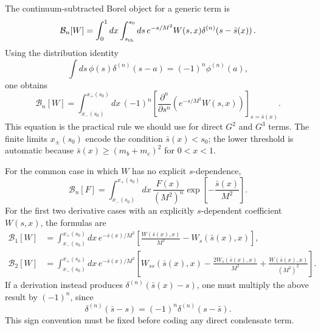 \documentclass[11pt]{article}
\begin{document}
The continuum-subtracted Borel object for a generic term is
\begin{equation}
  \mathcal B_n[W]
  =
  \int_0^1dx
  \int_{s_{\rm th}}^{s_0}ds\,
  e^{-s/M^2}
  W(s,x)
  \delta^{(n)}\!\left(s-\bar s(x)\right).
\end{equation}
Using the distribution identity
\begin{equation}
  \int ds\,\phi(s)\delta^{(n)}(s-a)
  =
  (-1)^n\phi^{(n)}(a),
\end{equation}
one obtains
\begin{equation}
  \mathcal B_n[W]
  =
  \int_{x_-(s_0)}^{x_+(s_0)}dx\,
  (-1)^n
  \left[
    \frac{\partial^n}{\partial s^n}
    \left(e^{-s/M^2}W(s,x)\right)
  \right]_{s=\bar s(x)}.
\end{equation}
This equation is the practical rule we should use for direct \(G^2\) and
\(G^3\) terms.  The finite limits \(x_\pm(s_0)\) encode the condition
\(\bar s(x)<s_0\); the lower threshold is automatic because
\(\bar s(x)\geq (m_b+m_c)^2\) for \(0<x<1\).

For the common case in which \(W\) has no explicit \(s\)-dependence,
\begin{equation}
  \mathcal B_n[F]
  =
  \int_{x_-(s_0)}^{x_+(s_0)}dx\,
  \frac{F(x)}{(M^2)^n}
  \exp\!\left[-\frac{\bar s(x)}{M^2}\right].
\end{equation}
For the first two derivative cases with an explicitly \(s\)-dependent
coefficient \(W(s,x)\), the formulas are
\begin{align}
  \mathcal B_1[W]
  &=
  \int_{x_-(s_0)}^{x_+(s_0)}dx\,
  e^{-\bar s(x)/M^2}
  \left[
    \frac{W(\bar s(x),x)}{M^2}
    -
    W_s(\bar s(x),x)
  \right],
  \\
  \mathcal B_2[W]
  &=
  \int_{x_-(s_0)}^{x_+(s_0)}dx\,
  e^{-\bar s(x)/M^2}
  \left[
    W_{ss}(\bar s(x),x)
    -
    \frac{2W_s(\bar s(x),x)}{M^2}
    +
    \frac{W(\bar s(x),x)}{(M^2)^2}
  \right].
\end{align}
If a derivation instead produces
\(\delta^{(n)}(\bar s(x)-s)\), one must multiply the above result by
\((-1)^n\), since
\begin{equation}
  \delta^{(n)}(\bar s-s)=(-1)^n\delta^{(n)}(s-\bar s).
\end{equation}
This sign convention must be fixed before coding any direct condensate term.
\end{document}
